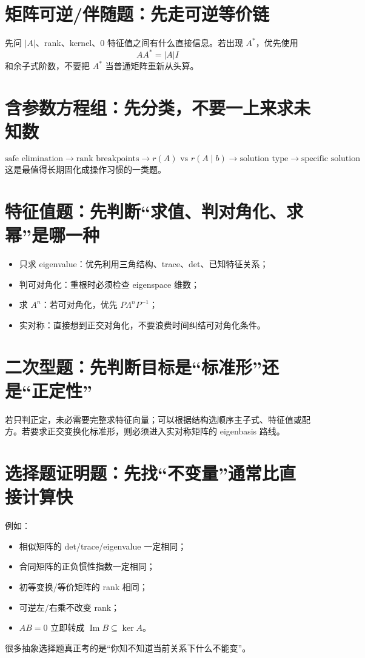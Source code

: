 \documentclass[11pt,a4paper,openany]{ctexbook}
\begin{document}
\section{矩阵可逆/伴随题：先走可逆等价链}
先问 $\lvert A\rvert$、rank、kernel、0 特征值之间有什么直接信息。若出现 $A^*$，优先使用
\[
AA^*=\lvert A\rvert I
\]
和余子式阶数，不要把 $A^*$ 当普通矩阵重新从头算。

\section{含参数方程组：先分类，不要一上来求未知数}
\[
\boxed{\text{safe elimination}\to\text{rank breakpoints}\to r(A)\text{ vs }r(A\mid b)\to\text{solution type}\to\text{specific solution}}.
\]
这是最值得长期固化成操作习惯的一类题。

\section{特征值题：先判断“求值、判对角化、求幂”是哪一种}
\begin{itemize}
  \item 只求 eigenvalue：优先利用三角结构、trace、det、已知特征关系；
  \item 判可对角化：重根时必须检查 eigenspace 维数；
  \item 求 $A^n$：若可对角化，优先 $P\Lambda^nP^{-1}$；
  \item 实对称：直接想到正交对角化，不要浪费时间纠结可对角化条件。
\end{itemize}

\section{二次型题：先判断目标是“标准形”还是“正定性”}
若只判正定，未必需要完整求特征向量；可以根据结构选顺序主子式、特征值或配方。若要求正交变换化标准形，则必须进入实对称矩阵的 eigenbasis 路线。

\section{选择题证明题：先找“不变量”通常比直接计算快}
例如：
\begin{itemize}
  \item 相似矩阵的 det/trace/eigenvalue 一定相同；
  \item 合同矩阵的正负惯性指数一定相同；
  \item 初等变换/等价矩阵的 rank 相同；
  \item 可逆左/右乘不改变 rank；
  \item $AB=0$ 立即转成 $\operatorname{Im}B\subseteq\ker A$。
\end{itemize}
很多抽象选择题真正考的是“你知不知道当前关系下什么不能变”。
\end{document}
